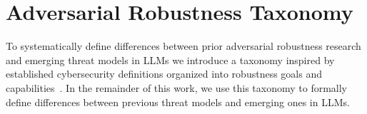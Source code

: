 \vspace{-10pt}
\section{Adversarial Robustness Taxonomy}

To systematically define differences between prior adversarial robustness research and emerging threat models in LLMs we introduce a taxonomy inspired by established cybersecurity definitions organized into robustness goals and capabilities~\citep{papernot_practical_2017, carlini_evaluating_2019}. In the remainder of this work, we use this taxonomy to formally define differences between previous threat models and emerging ones in LLMs.

\vspace{-5pt}

